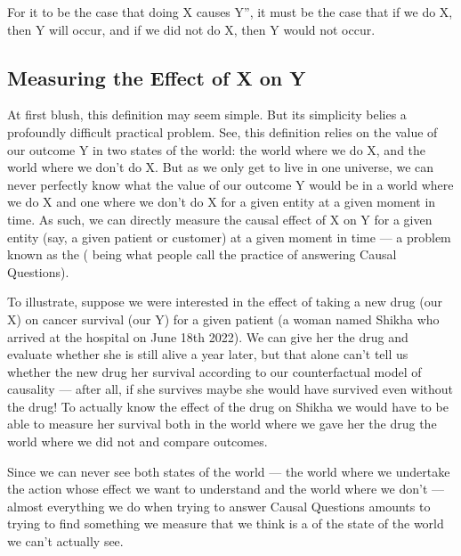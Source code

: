 \documentclass[letterpaper,10pt,english]{jupyterBook}
\begin{document}
\begin{sphinxShadowBox}

\sphinxAtStartPar
For it to be the case that doing X causes Y”, it must be the case that if we do X, then Y will occur, and if we did not do X, then Y would not occur.
\end{sphinxShadowBox}


\subsection{Measuring the Effect of X on Y}
\label{\detokenize{30_questions/40_answering_causal_questions:measuring-the-effect-of-x-on-y}}
\sphinxAtStartPar
At first blush, this definition may seem simple. But its simplicity belies a profoundly difficult practical problem. See, this definition relies on  the value of our outcome Y in two states of the world: the world where we do X, and the world where we don’t do X. But as we only get to live in one universe, we can never perfectly know what the value of our outcome Y would be in  a world where we do X and one where we don’t do X for a given entity at a given moment in time. As such, we can  directly measure the causal effect of X on Y for a given entity (say, a given patient or customer) at a given moment in time — a problem known as the  ( being what people call the practice of answering Causal Questions).

\sphinxAtStartPar
To illustrate, suppose we were interested in the effect of taking a new drug (our X) on cancer survival (our Y) for a given patient (a woman named Shikha who arrived at the hospital on June 18th 2022). We can give her the drug and evaluate whether she is still alive a year later, but that alone can’t tell us whether the new drug  her survival according to our counterfactual model of causality — after all, if she survives maybe she would have survived even without the drug! To actually know the effect of the drug on Shikha  we would have to be able to measure her survival both in the world where we gave her the drug  the world where we did not and compare outcomes.

\sphinxAtStartPar
Since we can never see both states of the world — the world where we undertake the action whose effect we want to understand and the world where we don’t — almost everything we do when trying to answer Causal Questions amounts to trying to find something we  measure that we think is a  of the state of the world we can’t actually see.
\end{document}
